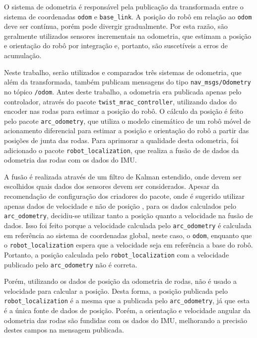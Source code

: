 \documentclass[repeatfields,xlists,xpacks,oneside,yearsonly]{ufrgscca}
\begin{document}
O sistema de odometria é responsável pela publicação da transformada
entre o sistema de coordenadas \texttt{odom} e \texttt{base\_link}. A
posição do robô em relação ao \texttt{odom} deve ser contínua, porém
pode divergir gradualmente. Por esta razão, são geralmente utilizados
sensores incrementais na odometria, que estimam a posição e
orientação do robô por integração e, portanto, são suscetíveis a
erros de acumulação. 

Neste trabalho, serão utilizados e comparados três sistemas de
odometria, que além da transformada, também publicam mensagens do
tipo \texttt{nav\_msgs/Odometry} no tópico \texttt{/odom}. Antes
deste trabalho, a odometria era publicada apenas pelo controlador,
através do pacote \texttt{twist\_mrac\_controller}, utilizando dados
do encoder nas rodas para estimar a posição do robô. O cálculo da
posição é feito pelo pacote \texttt{arc\_odometry}, que utiliza o
modelo cinemático de um robô móvel de acionamento diferencial para
estimar a posição e orientação do robô a partir das posições de junta
das rodas. Para aprimorar a qualidade desta odometria, foi adicionado
o pacote \texttt{robot\_localization}, que realiza a fusão de de
dados da odometria das rodas com os dados do IMU.

A fusão é realizada através de um filtro de Kalman estendido, onde
devem ser escolhidos quais dados dos sensores devem ser considerados.
Apesar da recomendação de configuração dos criadores do pacote, onde
é sugerido utilizar apenas dados de velocidade e não de posição
\cite{robot_localization_guide}, para os dados calculados pelo
\texttt{arc\_odometry}, decidiu-se utilizar tanto a posição quanto a
velocidade na fusão de dados. Isso foi feito porque a velocidade
calculada pelo \texttt{arc\_odometry} é calculada em referência ao
sistema de coordenadas global, neste caso, o \texttt{odom}, enquanto
que o \texttt{robot\_localization} espera que a velocidade seja em
referência a base do robô. Portanto, a posição calculada pelo
\texttt{robot\_localization} com a velocidade publicado pelo
\texttt{arc\_odometry} não é correta.

Porém, utilizando os dados de posição da odometria de rodas, não é
usado a velocidade para calcular a posição. Desta forma, a posição
publicada pelo \texttt{robot\_localization} é a mesma que a publicada
pelo \texttt{arc\_odometry}, já que esta é a única fonte de dados de
posição. Porém, a orientação e velocidade angular da odometria das
rodas são fundidas com os dados do IMU, melhorando a precisão destes
campos na mensagem publicada.
\end{document}
